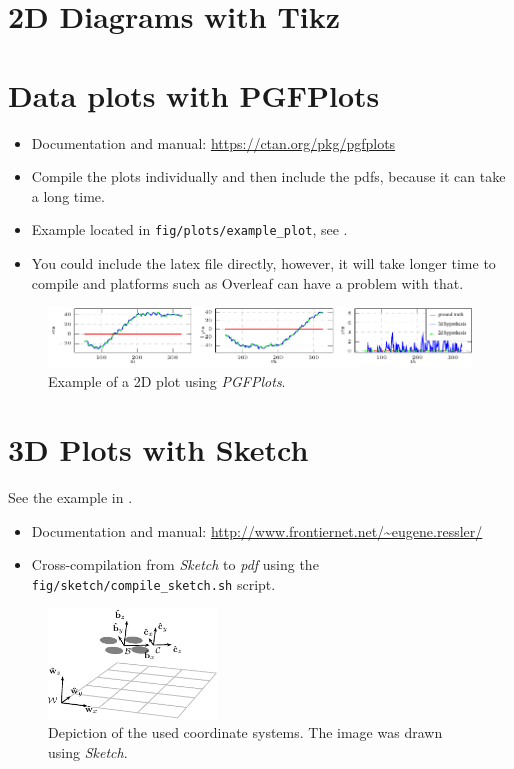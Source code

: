 \section{2D Diagrams with Tikz}

\section{Data plots with PGFPlots}

\begin{itemize}
  \item Documentation and manual: \url{https://ctan.org/pkg/pgfplots}
  \item Compile the plots individually and then include the pdfs, because it can take a long time.
  \item Example located in \texttt{fig/plots/example\_plot}, see .
  \item You could include the latex file directly, however, it will take longer time to compile and platforms such as Overleaf can have a problem with that.
\end{itemize}

\begin{figure}[!h]
  \centering
  \includegraphics[width=1.0\textwidth]{./fig/plots/example_plot/hypotheses.pdf}
  \caption{Example of a 2D plot using \emph{PGFPlots}.}
  \label{fig:pgfplots}
\end{figure}

\section{3D Plots with Sketch}

See the example in .

\begin{itemize}
  \item Documentation and manual: \url{http://www.frontiernet.net/~eugene.ressler/}
  \item Cross-compilation from \emph{Sketch} to \emph{pdf} using the \texttt{fig/sketch/compile\_sketch.sh} script.
\end{itemize}

\begin{figure}[!h]
  \centering
  \includegraphics[width=0.4\textwidth]{./fig/sketch/coordinate_frames.pdf}
  \caption{Depiction of the used coordinate systems. The image was drawn using \emph{Sketch}.}
  \label{fig:coordinate_systems}
\end{figure}

